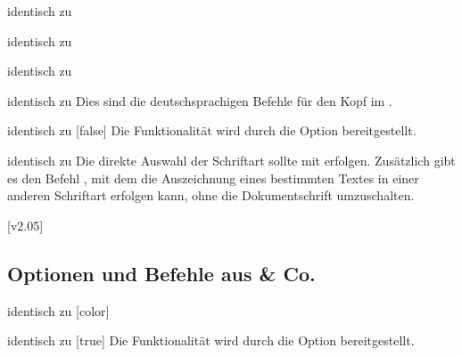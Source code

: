 \begin{Declaration*}{}
\begin{Declaration}{}{%
  identisch zu %
}
\begin{Declaration}{}{%
  identisch zu %
}
\begin{Declaration}{}{%
  identisch zu %
}
\begin{Declaration}{}{%
  identisch zu %
}
\printdeclarationlist*%
%
Dies sind die deutschsprachigen Befehle für den Kopf im \CD.
\end{Declaration}
\end{Declaration}
\end{Declaration}
\end{Declaration}

\begin{Declaration}{}{%
  identisch zu [false]%
}
\printdeclarationlist*%
%
Die Funktionalität wird durch die Option  bereitgestellt.
\end{Declaration}

\begin{Declaration}{}{%
  identisch zu %
}
\printdeclarationlist*%
%
Die direkte Auswahl der Schriftart sollte mit  erfolgen. 
Zusätzlich gibt es den Befehl , mit dem die Auszeichnung 
eines bestimmten Textes in einer anderen Schriftart erfolgen kann, ohne die 
Dokumentschrift umzuschalten.
\end{Declaration}
[v2.05]

\subsection{Optionen und Befehle aus  \& Co.}
\begin{Declaration}{}{%
  identisch zu [color]%
}
\begin{Declaration}{}{%
  identisch zu [true]%
}
\printdeclarationlist*%
%
Die Funktionalität wird durch die Option  bereitgestellt.
\end{Declaration}
\end{Declaration}


\end{Declaration*}
